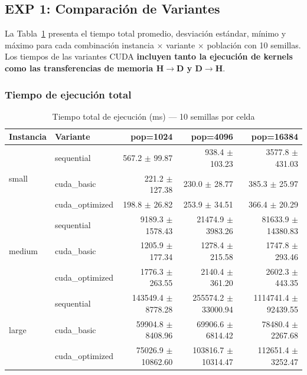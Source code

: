 \subsection{EXP 1: Comparación de Variantes}

La Tabla~\ref{tab:exp1_tiempo} presenta el tiempo total promedio, desviación
estándar, mínimo y máximo para cada combinación instancia $\times$ variante
$\times$ población con 10 semillas. Los tiempos de las variantes CUDA
\textbf{incluyen tanto la ejecución de kernels como las transferencias de
memoria H$\to$D y D$\to$H}.

\subsubsection{Tiempo de ejecución total}

\begin{table}[H]
  \centering
  \caption{Tiempo total de ejecución (ms) — 10 semillas por celda}
  \label{tab:exp1_tiempo}
  \begin{tabular}{llrrr}
    \toprule
    \textbf{Instancia} & \textbf{Variante} &
    \textbf{pop=1024} & \textbf{pop=4096} & \textbf{pop=16384} \\
    \midrule
    \multirow{3}{*}{small}
        & sequential      & 567.2 $\pm$ 99.87    & 938.4 $\pm$ 103.23   & 3577.8 $\pm$ 431.03 \\
        & cuda\_basic     & 221.2 $\pm$ 127.38   & 230.0 $\pm$ 28.77    & 385.3 $\pm$ 25.97 \\
        & cuda\_optimized & 198.8 $\pm$ 26.82    & 253.9 $\pm$ 34.51    & 366.4 $\pm$ 20.29 \\
    \midrule
    \multirow{3}{*}{medium}
        & sequential      & 9189.3 $\pm$ 1578.43 & 21474.9 $\pm$ 3983.26 & 81633.9 $\pm$ 14380.83 \\
        & cuda\_basic     & 1205.9 $\pm$ 177.34  & 1278.4 $\pm$ 215.58   & 1747.8 $\pm$ 293.46 \\
        & cuda\_optimized & 1776.3 $\pm$ 263.55  & 2140.4 $\pm$ 361.20   & 2602.3 $\pm$ 443.35 \\
    \midrule
    \multirow{3}{*}{large}
        & sequential      & 143549.4 $\pm$ 8778.28 & 255574.2 $\pm$ 33000.94 & 1114741.4 $\pm$ 92439.55 \\
        & cuda\_basic     & 59904.8 $\pm$ 8408.96  & 69906.6 $\pm$ 6814.42   & 78480.4 $\pm$ 2267.68 \\
        & cuda\_optimized & 75026.9 $\pm$ 10862.60 & 103816.7 $\pm$ 10314.47 & 112651.4 $\pm$ 3252.47 \\
    \bottomrule
  \end{tabular}
\end{table}

